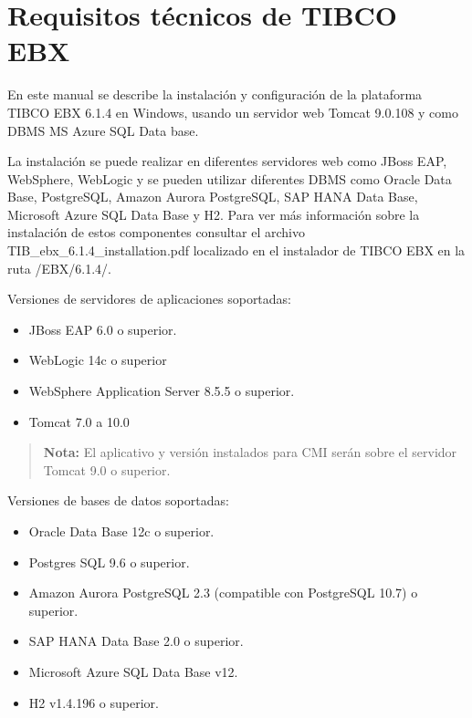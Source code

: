 \section{Requisitos técnicos de TIBCO EBX }

En este manual se describe la instalación y configuración de la plataforma TIBCO EBX 6.1.4 en Windows, usando un servidor web Tomcat 9.0.108 y como DBMS MS Azure SQL Data base. 

La instalación se puede realizar en diferentes servidores web como JBoss EAP, WebSphere, WebLogic y se pueden utilizar diferentes DBMS como Oracle Data Base, PostgreSQL, Amazon Aurora PostgreSQL, SAP HANA Data Base, Microsoft Azure SQL Data Base y H2. Para ver más información sobre la instalación de estos componentes consultar el archivo TIB\_ebx\_6.1.4\_installation.pdf localizado en el instalador de TIBCO EBX en la ruta /EBX/6.1.4/. 

Versiones de servidores de aplicaciones soportadas: 
\begin{itemize}
  \item JBoss EAP 6.0 o superior. 
  \item WebLogic 14c o superior
  \item WebSphere Application Server 8.5.5 o superior. 
  \item Tomcat 7.0 a 10.0 
\end{itemize}

\begin{quote}
  \textbf{Nota:} El aplicativo y versión instalados para CMI serán sobre el servidor Tomcat 9.0 o superior.
\end{quote}

Versiones de bases de datos soportadas: 
\begin{itemize}
    \item Oracle Data Base 12c o superior. 
    \item Postgres SQL 9.6 o superior. 
    \item Amazon Aurora PostgreSQL 2.3 (compatible con PostgreSQL 10.7) o superior. 
    \item SAP HANA Data Base 2.0 o superior. 
    \item Microsoft Azure SQL Data Base v12. 
    \item H2 v1.4.196 o superior. 

\end{itemize}